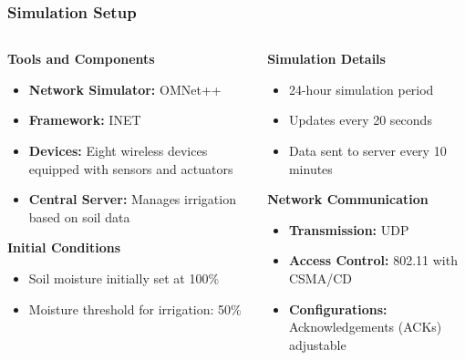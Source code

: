 \begin{frame}
    \frametitle{Simulation Setup}
    \begin{columns}[T] %
        \begin{column}{.48\textwidth} %
            \textbf{Tools and Components}
            \begin{itemize}
                \item \textbf{Network Simulator:} OMNet++
                \item \textbf{Framework:} INET
                \item \textbf{Devices:} Eight wireless devices equipped with sensors and actuators
                \item \textbf{Central Server:} Manages irrigation based on soil data
            \end{itemize}

            \textbf{Initial Conditions}
            \begin{itemize}
                \item Soil moisture initially set at 100\%
                \item Moisture threshold for irrigation: 50\%
            \end{itemize}
        \end{column}
        \begin{column}{.48\textwidth} %
            \textbf{Simulation Details}
            \begin{itemize}
                \item 24-hour simulation period
                \item Updates every 20 seconds
                \item Data sent to server every 10 minutes
            \end{itemize}

            \textbf{Network Communication}
            \begin{itemize}
                \item \textbf{Transmission:} UDP
                \item \textbf{Access Control:} 802.11 with CSMA/CD
                \item \textbf{Configurations:} Acknowledgements (ACKs) adjustable
            \end{itemize}
        \end{column}
    \end{columns}
\end{frame}

